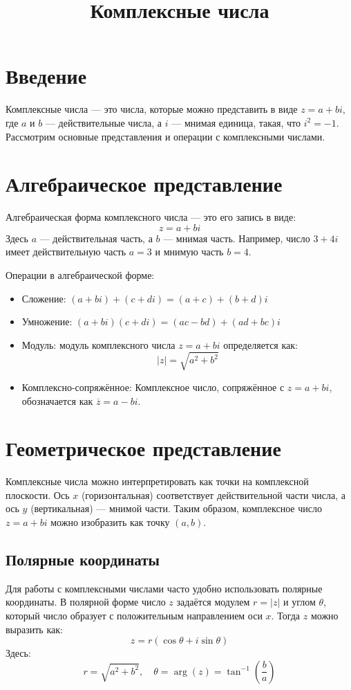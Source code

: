 \documentclass[a4paper,12pt]{article}
\title{Комплексные числа}
\author{ }
\date{ }
\begin{document}
\maketitle

\section{Введение}
Комплексные числа — это числа, которые можно представить в виде \( z = a + bi \), где \( a \) и \( b \) — действительные числа, а \( i \) — мнимая единица, такая, что \( i^2 = -1 \). Рассмотрим основные представления и операции с комплексными числами.

\section{Алгебраическое представление}
Алгебраическая форма комплексного числа — это его запись в виде:
\[
z = a + bi
\]
Здесь \( a \) — действительная часть, а \( b \) — мнимая часть. Например, число \( 3 + 4i \) имеет действительную часть \( a = 3 \) и мнимую часть \( b = 4 \).

Операции в алгебраической форме:
\begin{itemize}
    \item Сложение: \( (a + bi) + (c + di) = (a + c) + (b + d)i \)
    \item Умножение: \( (a + bi)(c + di) = (ac - bd) + (ad + bc)i \)
    \item Модуль: модуль комплексного числа \( z = a + bi \) определяется как:
    \[
    |z| = \sqrt{a^2 + b^2}
    \]
    \item Комплексно-сопряжённое: Комплексное число, сопряжённое с \( z = a + bi \), обозначается как \( \overline{z} = a - bi \).
\end{itemize}

\section{Геометрическое представление}
Комплексные числа можно интерпретировать как точки на комплексной плоскости. Ось \( x \) (горизонтальная) соответствует действительной части числа, а ось \( y \) (вертикальная) — мнимой части. Таким образом, комплексное число \( z = a + bi \) можно изобразить как точку \( (a, b) \).

\subsection{Полярные координаты}
Для работы с комплексными числами часто удобно использовать полярные координаты. В полярной форме число \( z \) задаётся модулем \( r = |z| \) и углом \( \theta \), который число образует с положительным направлением оси \( x \). Тогда \( z \) можно выразить как:
\[
z = r (\cos \theta + i \sin \theta)
\]
Здесь:
\[
r = \sqrt{a^2 + b^2}, \quad \theta = \arg(z) = \tan^{-1} \left( \frac{b}{a} \right)
\]
\end{document}
